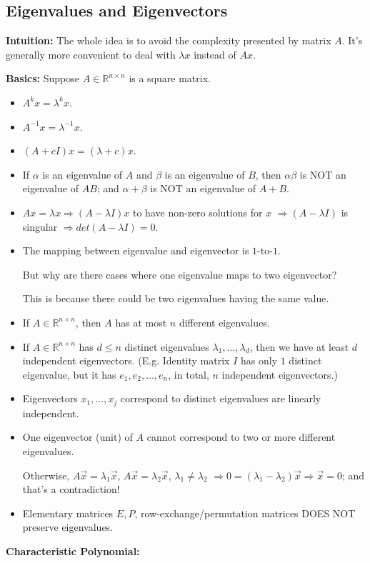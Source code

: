 \documentclass[13pt]{article}
\theoremstyle{definition}
\theoremstyle{remark}
\begin{document}
\begin{multicols}{2}
\section{Eigenvalues and Eigenvectors}
\textbf{Intuition:} The whole idea is to avoid the complexity presented by matrix $A$. It's generally more convenient to deal with $\lambda x$ instead of $Ax$.

\textbf{Basics:} Suppose $A \in \mathbb{R}^{n\times n}$ is a square matrix.
\begin{itemize}
    \item $A^k x = \lambda^k x$.
    \item $A^{-1}x = \lambda^{-1} x$.
    \item $(A+cI)x = (\lambda+c)x$.
    \item If $\alpha$ is an eigenvalue of $A$ and $\beta$ is an eigenvalue of $B$, then $\alpha\beta$ is NOT an eigenvalue of $AB$; and $\alpha + \beta$ is NOT an eigenvalue of $A + B$.
    \item $Ax=\lambda x \Longrightarrow (A-\lambda I)x$ to have non-zero solutions for $x$ $\Longrightarrow  (A-\lambda I)$ is singular $\Longrightarrow det(A-\lambda I) = 0$.
    \item The mapping between eigenvalue and eigenvector is $1$-to-$1$. 
    
    But why are there cases where one eigenvalue maps to two eigenvector? 
    
    This is because there could be two eigenvalues having the same value. 
    \item If $A \in \mathbb{R}^{n\times n}$, then $A$ has at most $n$ different eigenvalues.
    \item If $A\in \mathbb{R}^{n\times n}$ has $d\le n$ distinct eigenvalues $\lambda_1, \ldots, \lambda_d$, then we have at least $d$ independent eigenvectors. (E.g. Identity matrix $I$ has only $1$ distinct eigenvalue, but it has $e_1, e_2, \ldots, e_n$, in total, $n$ independent eigenvectors.)
    \item Eigenvectors $x_1, \ldots,x_j$ correspond to distinct eigenvalues are linearly independent.
    \item One eigenvector (unit) of $A$ cannot correspond to two or more different eigenvalues.
    
Otherwise, $A \vec{x}=\lambda_1 \vec{x}$, $A \vec{x}=\lambda_2 \vec{x}$, $\lambda_1 \neq \lambda_2$
$\Rightarrow 0=\left(\lambda_1-\lambda_2\right) \vec{x} \Rightarrow \vec{x}=0$; and that's a contradiction!
    \item Elementary matrices $E, P$, row-exchange/permutation matrices DOES NOT preserve eigenvalues.
\end{itemize}
\textbf{Characteristic Polynomial:}


\end{multicols}
\end{document}
